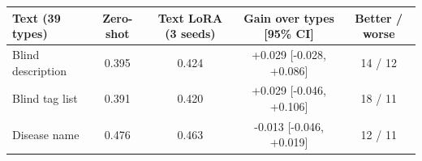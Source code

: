\begin{tabular}{lcccc}\toprule Text (39 types) & Zero-shot & Text LoRA (3 seeds) & Gain over types [95\% CI] & Better / worse\\\midrule
Blind description & 0.395 & 0.424 & +0.029 [-0.028, +0.086] & 14 / 12\\
Blind tag list & 0.391 & 0.420 & +0.029 [-0.046, +0.106] & 18 / 11\\
Disease name & 0.476 & 0.463 & -0.013 [-0.046, +0.019] & 12 / 11\\
\bottomrule\end{tabular}
